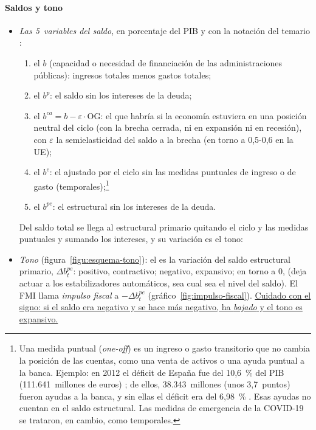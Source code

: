 \documentclass[11pt]{article}
\begin{document}
\paragraph{Saldos y tono}
\begin{itemize}
\item \emph{Las 5~variables del saldo}, en porcentaje del PIB y con la notación del temario :
  \begin{enumerate}
  \item el  $b$ (capacidad o necesidad de financiación de las administraciones públicas): ingresos totales menos gastos totales;
  \item el  $b^p$: el saldo sin los intereses de la deuda;
  \item el  $b^{ca}=b-\varepsilon\cdot\mathrm{OG}$: el que habría si la economía estuviera en una posición neutral del ciclo (con la brecha cerrada, ni en expansión ni en recesión), con $\varepsilon$ la semielasticidad del saldo a la brecha (en torno a 0,5-0,6 en la UE);
  \item el  $b^e$: el ajustado por el ciclo sin las medidas puntuales de ingreso o de gasto (temporales);\footnote{Una medida puntual (\emph{one-off}) es un ingreso o gasto transitorio que no cambia la posición de las cuentas, como una venta de activos o una ayuda puntual a la banca. Ejemplo: en 2012 el déficit de España fue del 10,6~\% del PIB (111.641~millones de euros) \parencite{Eurostat2013EDP}; de ellos, 38.343~millones (unos 3,7~puntos) fueron ayudas a la banca, y sin ellas el déficit era del 6,98~\% \parencite{SEPG2013Deficit}. Esas ayudas no cuentan en el saldo estructural. Las medidas de emergencia de la COVID-19 se trataron, en cambio, como temporales.}
  \item el  $b^{pe}$: el estructural sin los intereses de la deuda.
  \end{enumerate}
  Del saldo total se llega al estructural primario quitando el ciclo y las medidas puntuales y sumando los intereses, y su variación es el tono:
\item \emph{Tono} (figura~\ref{figu:esquema-tono}): el  es la variación del saldo estructural primario, $\Delta b^{pe}_t$: positivo, contractivo; negativo, expansivo; en torno a 0,  (deja actuar a los estabilizadores automáticos, sea cual sea el nivel del saldo). El FMI llama \emph{impulso fiscal} a $-\Delta b^{pe}_t$ (gráfico~\ref{fig:impulso-fiscal}). \uline{Cuidado con el signo: si el saldo era negativo y se hace más negativo, ha \emph{bajado} y el tono es expansivo.}

\end{itemize}
\end{document}
